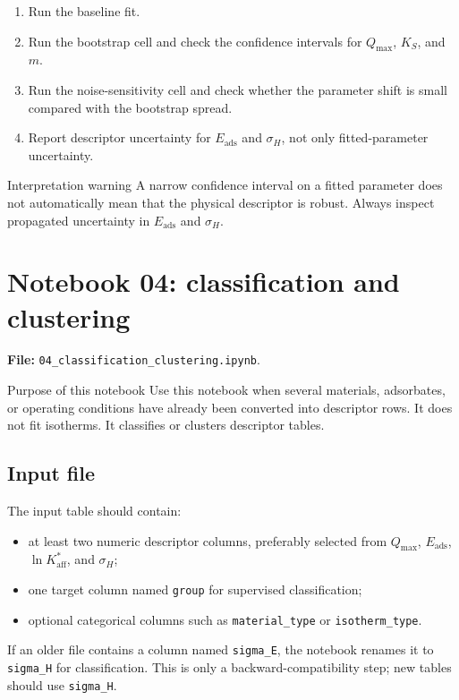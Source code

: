 \documentclass[journal=jacsat,manuscript=article]{achemso}
\begin{document}
\begin{enumerate}
	\item Run the baseline fit.
	\item Run the bootstrap cell and check the confidence intervals for
	\(Q_{\max}\), \(K_S\), and \(m\).
	\item Run the noise-sensitivity cell and check whether the parameter shift
	is small compared with the bootstrap spread.
	\item Report descriptor uncertainty for \(E_{\mathrm{ads}}\) and
	\(\sigma_H\), not only fitted-parameter uncertainty.
\end{enumerate}

\begin{redbox}{Interpretation warning}
	A narrow confidence interval on a fitted parameter does not automatically
	mean that the physical descriptor is robust. Always inspect propagated
	uncertainty in \(E_{\mathrm{ads}}\) and \(\sigma_H\).
\end{redbox}

\section{Notebook 04: classification and clustering}
\label{app:si_notebook_04}

\noindent\textbf{File:} \texttt{04\_classification\_clustering.ipynb}.

\begin{bluebox}{Purpose of this notebook}
	Use this notebook when several materials, adsorbates, or operating
	conditions have already been converted into descriptor rows. It does not
	fit isotherms. It classifies or clusters descriptor tables.
\end{bluebox}

\subsection*{Input file}

The input table should contain:
\begin{itemize}
	\item at least two numeric descriptor columns, preferably selected from
	\(Q_{\max}\), \(E_{\mathrm{ads}}\), \(\ln K_{\mathrm{aff}}^{\ast}\), and
	\(\sigma_H\);
	\item one target column named \texttt{group} for supervised classification;
	\item optional categorical columns such as \texttt{material\_type} or
	\texttt{isotherm\_type}.
\end{itemize}
If an older file contains a column named \texttt{sigma\_E}, the notebook
renames it to \texttt{sigma\_H} for classification. This is only a
backward-compatibility step; new tables should use \texttt{sigma\_H}.
\end{document}
